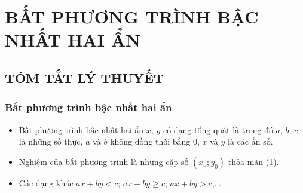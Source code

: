 \section{BẤT PHƯƠNG TRÌNH BẬC NHẤT HAI ẨN}

\subsection{TÓM TẮT LÝ THUYẾT}
\subsubsection{Bất phương trình bậc nhất hai ẩn}
\begin{itemize}
	\item [\iconCH] Bất phương trình bậc nhất hai ẩn $x$, $y$ có dạng tổng quát là 
	trong đó $a$, $b$, $c$ là những số thực, $a$ và $b$ không đồng thời bằng $0$, $x$ và $y$ là các ẩn số.
	\item [\iconCH] Nghiệm của bất phương trình là những cặp số $(x_0;y_0)$ thỏa mãn (1).
	\item [\iconCH] Các dạng khác $ax+by<c$; $ax+by\ge c$; $ax+by>c$,...
\end{itemize}

